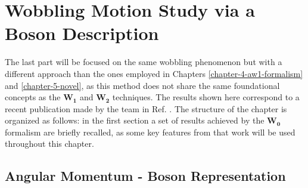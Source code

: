 \chapter{Wobbling Motion Study via a Boson Description}
\label{extra-chapter-new-boson}

The last part will be focused on the same wobbling phenomenon but with a different approach than the ones employed in Chapters \ref{chapter-4-aw1-formalism} and \ref{chapter-5-novel}, as this method does not share the same foundational concepts as the $\mathbf{W_1}$ and $\mathbf{W_2}$ techniques. The results shown here correspond to a recent publication made by the team in Ref. \cite{raduta2020new}. The structure of the chapter is organized as follows: in the first section a set of results achieved by the $\mathbf{W_0}$ formalism are briefly recalled, as some key features from that work will be used throughout this chapter. 

\section{Angular Momentum - Boson Representation}
\label{section-intro-boson-representation}

